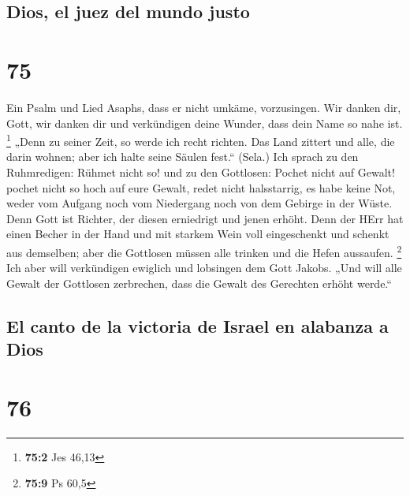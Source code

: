 \hypertarget{dios-el-juez-del-mundo-justo}{%
\subsection{Dios, el juez del mundo
justo}\label{dios-el-juez-del-mundo-justo}}

\hypertarget{section-74}{%
\section{75}\label{section-74}}

 Ein Psalm und Lied Asaphs, dass er nicht umkäme,
vorzusingen.  Wir danken dir, Gott, wir danken dir und
verkündigen deine Wunder, dass dein Name so nahe ist. \footnote{\textbf{75:2}
  Jes 46,13}  „Denn zu seiner Zeit, so werde ich recht
richten.  Das Land zittert und alle, die darin wohnen;
aber ich halte seine Säulen fest.`` (Sela.)  Ich sprach zu
den Ruhmredigen: Rühmet nicht so! und zu den Gottlosen: Pochet nicht auf
Gewalt!  pochet nicht so hoch auf eure Gewalt, redet nicht
halsstarrig,  es habe keine Not, weder vom Aufgang noch
vom Niedergang noch von dem Gebirge in der Wüste.  Denn
Gott ist Richter, der diesen erniedrigt und jenen erhöht. 
Denn der HErr hat einen Becher in der Hand und mit starkem Wein voll
eingeschenkt und schenkt aus demselben; aber die Gottlosen müssen alle
trinken und die Hefen aussaufen. \footnote{\textbf{75:9} Ps 60,5}
 Ich aber will verkündigen ewiglich und lobsingen dem
Gott Jakobs.  „Und will alle Gewalt der Gottlosen
zerbrechen, dass die Gewalt des Gerechten erhöht werde.``

\hypertarget{el-canto-de-la-victoria-de-israel-en-alabanza-a-dios}{%
\subsection{El canto de la victoria de Israel en alabanza a
Dios}\label{el-canto-de-la-victoria-de-israel-en-alabanza-a-dios}}

\hypertarget{section-75}{%
\section{76}\label{section-75}}

